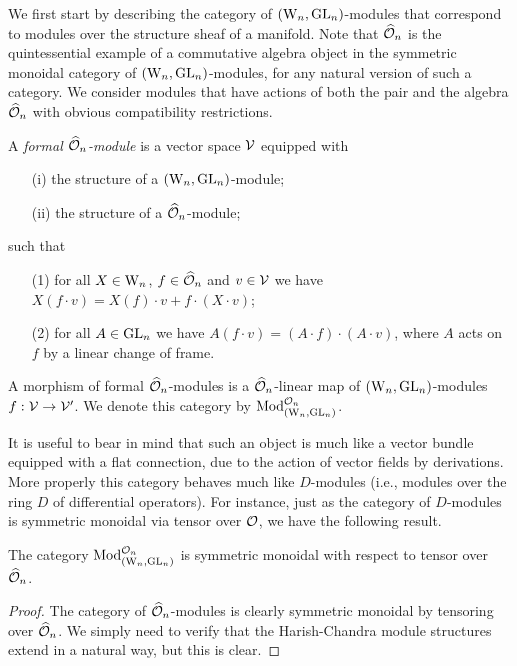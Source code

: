 We first start by describing the category of $({{\rm W}_n}, {\rm GL}_n)$-modules
that correspond to modules over the structure sheaf of a manifold. Note that $\widehat{\mathcal O}_n$ is the quintessential example of a commutative algebra object in the symmetric monoidal category of $({{\rm W}_n},{\rm GL}_n)$-modules, 
for any natural version of such a category. We consider modules that
have actions of both the pair and the algebra $\widehat{\mathcal O}_n$ with obvious
compatibility restrictions. 

\begin{dfn} A {\em formal $\widehat{\mathcal O}_n$-module} is a
  vector space $\mathcal{V}$ equipped with
\begin{itemize}
\item[(i)] the structure of a $({{\rm W}_n}, {\rm GL}_n)$-module;
\item[(ii)] the structure of a $\widehat{\mathcal O}_n$-module;
\end{itemize}
such that 
\begin{itemize}
\item[(1)] for all $X \in {{\rm W}_n}$, $f \in \widehat{\mathcal O}_n$ and $v \in \mathcal{V}$ we
  have $X(f \cdot v) = X(f) \cdot v + f \cdot (X \cdot v)$;
\item[(2)] for all $A \in {\rm GL}_n$ we have $A (f \cdot v) = (A \cdot f) \cdot (A \cdot v)$,  where $A$ acts on $f$ by a linear change of frame.
\end{itemize}
A morphism of formal $\widehat{\mathcal O}_n$-modules is a $\widehat{\mathcal O}_n$-linear map of
$({{\rm W}_n}, {\rm GL}_n)$-modules $f : \mathcal{V} \to \mathcal{V}'$. We denote this category
by ${\rm Mod}_{({{\rm W}_n}, {\rm GL}_n)}^{\mathcal O_n}$. 
\end{dfn}

It is useful to bear in mind that such an object is much like a vector bundle equipped with a flat connection,
due to the action of vector fields by derivations.
More properly this category behaves much like $D$-modules (i.e., modules over the ring $D$ of differential operators).
For instance, just as the category of $D$-modules is symmetric monoidal via tensor over $\mathcal O$, we have the following result.

\begin{lemma}
The category ${\rm Mod}^{\mathcal O_n}_{({{\rm W}_n}, {\rm GL}_n)}$ is symmetric monoidal with respect to tensor over $\widehat{\mathcal O}_n$.
\end{lemma} 

\begin{proof}
The category of $\widehat{\mathcal O}_n$-modules is clearly symmetric monoidal by tensoring over $\widehat{\mathcal O}_n$. We simply need to verify that the Harish-Chandra module structures extend in a natural way, but this is clear.
\end{proof}

